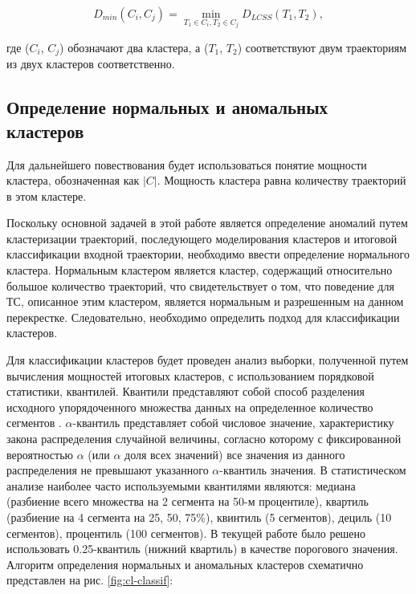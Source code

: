 \begin{equation} \label{eq:single_link}
D_{min}(C_i, C_j) = \min_{T_1 \in C_i, T_2 \in C_j} D_{LCSS}(T_1, T_2),
\end{equation} 

где ($C_i$, $C_j$) обозначают два кластера, а ($T_1$, $T_2$) соответствуют двум траекториям из двух кластеров соответственно.

\subsection{Определение нормальных и аномальных кластеров}

Для дальнейшего повествования будет использоваться понятие мощности кластера, обозначенная как $|C|$. Мощность кластера равна количеству траекторий в этом кластере.

Поскольку основной задачей в этой работе является определение аномалий путем кластеризации траекторий, последующего моделирования кластеров и итоговой классификации входной траектории, необходимо ввести определение нормального кластера. Нормальным кластером является кластер, содержащий относительно большое количество траекторий, что свидетельствует о том, что поведение для ТС, описанное этим кластером, является нормальным и разрешенным на данном перекрестке. Следовательно, необходимо определить подход для классификации кластеров.

Для классификации кластеров будет проведен анализ выборки, полученной путем вычисления мощностей итоговых кластеров, с использованием порядковой статистики, квантилей. Квантили представляют собой способ разделения исходного упорядоченного множества данных на определенное количество сегментов \cite{inbook:stats}. $\alpha$-квантиль представляет собой числовое значение, характеристику закона распределения случайной величины, согласно которому с фиксированной вероятностью $\alpha$ (или $\alpha$ доля всех значений) все значения из данного распределения не превышают указанного $\alpha$-квантиль значения. В статистическом анализе наиболее часто используемыми квантилями являются: медиана (разбиение всего множества на 2 сегмента на 50-м процентиле), квартиль (разбиение на 4 сегмента на 25, 50, 75\%), квинтиль (5 сегментов), дециль (10 сегментов), процентиль (100 сегментов). В текущей работе было решено использовать 0.25-квантиль (нижний квартиль) в качестве порогового значения. Алгоритм определения нормальных и аномальных кластеров схематично представлен на рис. \ref{fig:cl-classif}:

